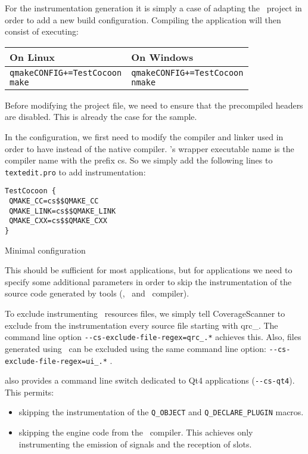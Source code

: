 For the instrumentation generation it is simply a case of adapting the
\qmake\ project in order to add a new build configuration. Compiling the
application will then consist of executing:

\begin{center}
\begin{tabular}{|p{7cm}|p{7cm}|} \hline
  On Linux & On Windows \\\hline
\begin{alltt}
qmake CONFIG+=TestCocoon
make
\end{alltt}
&
\begin{alltt}
qmake CONFIG+=TestCocoon
nmake
\end{alltt} \\ \hline
\end{tabular} 
\end{center} 

Before modifying the project file, we need to ensure that the precompiled
headers are disabled. This is already the case for the {\TextEdit} sample.

In the {\TestCocoon} configuration, we first need to modify the compiler and linker
used in order to have {\CoverageScanner} instead of the native compiler. {\CoverageScanner}'s
wrapper executable name is the compiler name with the prefix cs. So we simply
add the following lines to \texttt{textedit.pro} to add instrumentation:

\begin{listings}[H]
\begin{verbatim}
TestCocoon {
 QMAKE_CC=cs$$QMAKE_CC
 QMAKE_LINK=cs$$QMAKE_LINK
 QMAKE_CXX=cs$$QMAKE_CXX
}
\end{verbatim}
\caption{Minimal {\qmake} configuration}
\label{lst:qmake1}
\end{listings}

This should be sufficient for most applications, but for {\Qt} applications we need to
specify some additional parameters in order to skip the instrumentation of the
source code generated by {\Qt} tools (\uic, \qrc\ and \moc\ compiler).

To exclude instrumenting \qrc\ resources files, we simply tell CoverageScanner to
exclude from the instrumentation
every source file starting with qrc\_.
The command line option \verb$--cs-exclude-file-regex=qrc_.*$ achieves this.
Also, files generated using \uic\ can be excluded using the same command line
option: \verb$--cs-exclude-file-regex=ui_.*$ .

{\TestCocoon} also provides a command line switch dedicated to Qt4 applications
(\verb$--cs-qt4$). This permits:
\begin{itemize}
  \item skipping the instrumentation of the \verb$Q_OBJECT$ and
    \verb$Q_DECLARE_PLUGIN$ macros.
  \item skipping the engine code from the \moc\ compiler.
    This achieves only instrumenting the emission of signals and the reception
    of slots. 
\end{itemize}

